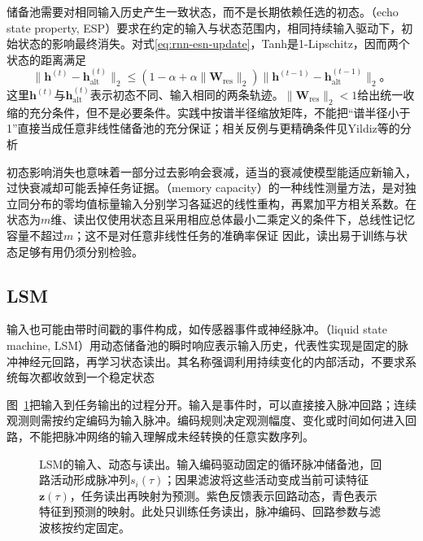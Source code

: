 储备池需要对相同输入历史产生一致状态，而不是长期依赖任选的初态。（echo state property, ESP）要求在约定的输入与状态范围内，相同持续输入驱动下，初始状态的影响最终消失。对式\eqref{eq:rnn-esn-update}，Tanh是1-Lipschitz，因而两个状态的距离满足
\begin{equation}
  \lVert\bm{h}^{(t)}-\bm{h}_{\mathrm{alt}}^{(t)}\rVert_2
    \leq\left(1-\alpha+\alpha\lVert\bm{W}_{\mathrm{res}}\rVert_2\right)
      \lVert\bm{h}^{(t-1)}-\bm{h}_{\mathrm{alt}}^{(t-1)}\rVert_2\text{。}
  \label{eq:rnn-esn-contraction}
\end{equation}
这里$\bm{h}^{(t)}$与$\bm{h}_{\mathrm{alt}}^{(t)}$表示初态不同、输入相同的两条轨迹。$\lVert\bm{W}_{\mathrm{res}}\rVert_2<1$给出统一收缩的充分条件，但不是必要条件。实践中按谱半径缩放矩阵，不能把“谱半径小于1”直接当成任意非线性储备池的充分保证；相关反例与更精确条件见Yildiz等的分析

初态影响消失也意味着一部分过去影响会衰减，适当的衰减使模型能适应新输入，过快衰减却可能丢掉任务证据。（memory capacity）的一种线性测量方法，是对独立同分布的零均值标量输入分别学习各延迟的线性重构，再累加平方相关系数。在状态为$m$维、读出仅使用状态且采用相应总体最小二乘定义的条件下，总线性记忆容量不超过$m$；这不是对任意非线性任务的准确率保证 因此，读出易于训练与状态足够有用仍须分别检验。

\subsection{LSM}
\label{sec:rnn-lsm}

输入也可能由带时间戳的事件构成，如传感器事件或神经脉冲。（liquid state machine, LSM）用动态储备池的瞬时响应表示输入历史，代表性实现是固定的脉冲神经元回路，再学习状态读出。其名称强调利用持续变化的内部活动，不要求系统每次都收敛到一个稳定状态

图~\ref{fig:rnn-lsm}把输入到任务输出的过程分开。输入是事件时，可以直接接入脉冲回路；连续观测则需按约定编码为输入脉冲。编码规则决定观测幅度、变化或时间如何进入回路，不能把脉冲网络的输入理解成未经转换的任意实数序列。
\begin{figure}[htb]
  \centering
  
  \caption{LSM的输入、动态与读出。输入编码驱动固定的循环脉冲储备池，回路活动形成脉冲列$s_i(\tau)$；因果滤波将这些活动变成当前可读特征$\bm z(\tau)$，任务读出再映射为预测。紫色反馈表示回路动态，青色表示特征到预测的映射。此处只训练任务读出，脉冲编码、回路参数与滤波核按约定固定。}
  \label{fig:rnn-lsm}
\end{figure}

